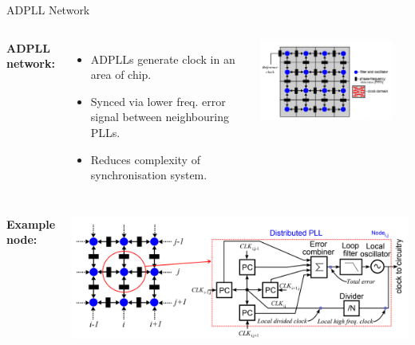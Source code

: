 \documentclass{beamer}
\begin{document}
\begin{frame}{ADPLL Network}
        
        \begin{columns}        	
        	\textbf{ADPLL network:}
	        \begin{itemize}
			    \item[]
			       	ADPLLs generate clock in an area of chip.
			    \item[]
			        Synced via lower freq. error signal between neighbouring PLLs.
       			\item[]
			        Reduces complexity of synchronisation system.
    		\end{itemize}
        	\includegraphics[scale=0.55]{network_ccic2013}
        \begin{flushright}[Zianbetov, 2013]\end{flushright}
        \end{columns}
        \begin{columns}
            \column{\linewidth}
            \vspace{0.1 cm}
    	    \textbf{Example node:}
    	    \begin{center}
		    \includegraphics[scale=0.3]{eldar_node}
		    \end{center}
        \end{columns}
\end{frame}
\end{document}
